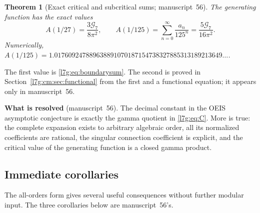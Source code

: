 \documentclass[11pt,letterpaper]{article}
\newtheorem{theorem}{Theorem}[section]
\theoremstyle{remark}\newtheorem{remark}[theorem]{Remark}
\newcommand{\G}{\mathcal G_7}\newcommand{\Ast}{A_\star}
\newcounter{l7gtrsavedeq}
\begin{document}
\begin{theorem}[Exact critical and subcritical sums; manuscript~56]\label{l7g:cm:thm:sums}
The generating function has the exact values
\begin{equation}\label{l7g:cm:eq:subcritical-sum}
 A(1/27)=\frac{3\G}{8\pi^2},\qquad
 A(1/125)=\sum_{n=0}^{\infty}\frac{a_n}{125^n}
 =\frac{5\G}{16\pi^2}.
\end{equation}
Numerically,
$A(1/125)=1.017609247889638891070187154738327885313189213649\ldots$.
\end{theorem}
The first value is \eqref{l7g:eq:boundarysum}. The second is proved in
Section~\ref{l7g:cm:sec:functional} from the first and a functional
equation; it appears only in manuscript~56.

\begin{resultbox}
\textbf{What is resolved} (manuscript~56).
The decimal constant in the OEIS asymptotic conjecture is exactly the
gamma quotient in \eqref{l7g:eq:C}. More is true: the complete expansion
exists to arbitrary algebraic order, all its normalized coefficients are
rational, the singular connection coefficient is explicit, and the
critical value of the generating function is a closed gamma product.
\end{resultbox}

\subsection{Immediate corollaries}
The all-orders form gives several useful consequences without further
modular input. The three corollaries below are manuscript~56's.
\end{document}
